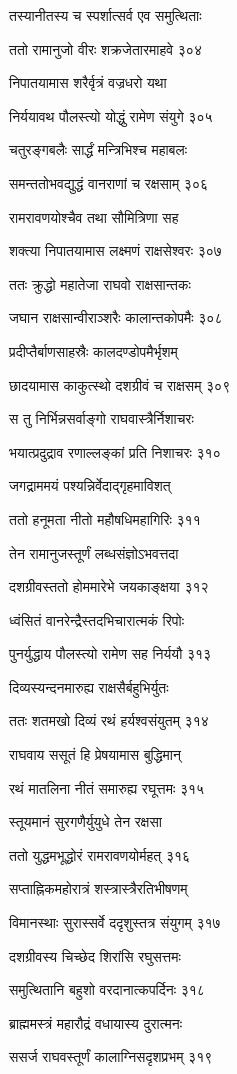 तस्यानीतस्य च स्पर्शात्सर्व एव समुत्थिताः

ततो रामानुजो वीरः शक्रजेतारमाहवे ३०४

निपातयामास शरैर्वृत्रं वज्रधरो यथा

निर्ययावथ पौलस्त्यो योद्धुं रामेण संयुगे ३०५

चतुरङ्गबलैः सार्द्धं मन्त्रिभिश्च महाबलः

समन्ततोभवद्युद्धं वानराणां च रक्षसाम् ३०६

रामरावणयोश्चैव तथा सौमित्रिणा सह

शक्त्या निपातयामास लक्ष्मणं राक्षसेश्वरः ३०७

ततः क्रुद्धो महातेजा राघवो राक्षसान्तकः

जघान राक्षसान्वीराञ्शरैः कालान्तकोपमैः ३०८

प्रदीप्तैर्बाणसाहस्रैः कालदण्डोपमैर्भृशम्

छादयामास काकुत्स्थो दशग्रीवं च राक्षसम् ३०९

स तु निर्भिन्नसर्वाङ्गो राघवास्त्रैर्निशाचरः

भयात्प्रदुद्राव रणाल्लङ्कां प्रति निशाचरः ३१०

जगद्राममयं पश्यन्निर्वेदाद्गृहमाविशत्

ततो हनूमता नीतो महौषधिमहागिरिः ३११

तेन रामानुजस्तूर्णं लब्धसंज्ञोऽभवत्तदा

दशग्रीवस्ततो होममारेभे जयकाङ्क्षया ३१२

ध्वंसितं वानरेन्द्रैस्तदभिचारात्मकं रिपोः

पुनर्युद्धाय पौलस्त्यो रामेण सह निर्ययौ ३१३

दिव्यस्यन्दनमारुह्य राक्षसैर्बहुभिर्युतः

ततः शतमखो दिव्यं रथं हर्यश्वसंयुतम् ३१४

राघवाय ससूतं हि प्रेषयामास बुद्धिमान्

रथं मातलिना नीतं समारुह्य रघूत्तमः ३१५

स्तूयमानं सुरगणैर्युयुधे तेन रक्षसा

ततो युद्धमभूद्धोरं रामरावणयोर्महत् ३१६

सप्ताह्निकमहोरात्रं शस्त्रास्त्रैरतिभीषणम्

विमानस्थाः सुरास्सर्वे ददृशुस्तत्र संयुगम् ३१७

दशग्रीवस्य चिच्छेद शिरांसि रघुसत्तमः

समुत्थितानि बहुशो वरदानात्कपर्दिनः ३१८

ब्राह्ममस्त्रं महारौद्रं वधायास्य दुरात्मनः

ससर्ज राघवस्तूर्णं कालाग्निसदृशप्रभम् ३१९

